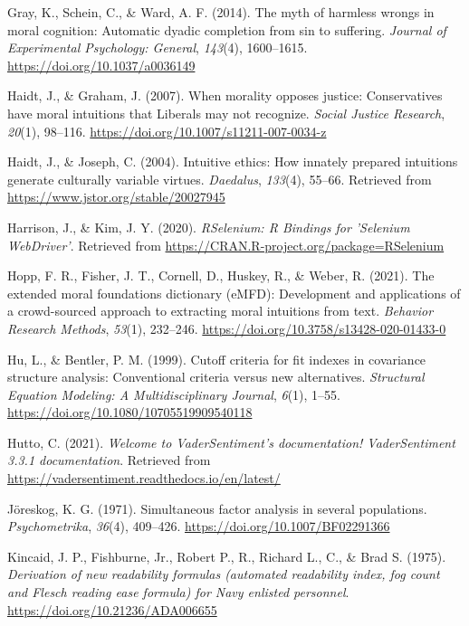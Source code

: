 \documentclass[
  man,floatsintext]{apa6}
\newlength{\cslhangindent}
\newenvironment{CSLReferences}[2] %
 {\begin{list}{}{%
  \setlength{\itemindent}{0pt}
  \setlength{\leftmargin}{0pt}
  \setlength{\parsep}{0pt}
  \ifodd #1
   \setlength{\leftmargin}{\cslhangindent}
   \setlength{\itemindent}{-1\cslhangindent}
  \fi
  \setlength{\itemsep}{#2\baselineskip}}}
 {\end{list}}
\begin{document}
\begin{CSLReferences}{1}{0}
Gray, K., Schein, C., \& Ward, A. F. (2014). The myth of harmless wrongs in moral cognition: Automatic dyadic completion from sin to suffering. \emph{Journal of Experimental Psychology: General}, \emph{143}(4), 1600--1615. \url{https://doi.org/10.1037/a0036149}

Haidt, J., \& Graham, J. (2007). {When morality opposes justice: Conservatives have moral intuitions that Liberals may not recognize}. \emph{Social Justice Research}, \emph{20}(1), 98--116. \url{https://doi.org/10.1007/s11211-007-0034-z}

Haidt, J., \& Joseph, C. (2004). Intuitive ethics: How innately prepared intuitions generate culturally variable virtues. \emph{Daedalus}, \emph{133}(4), 55--66. Retrieved from \url{https://www.jstor.org/stable/20027945}

Harrison, J., \& Kim, J. Y. (2020). \emph{{RSelenium}: {R} {Bindings} for '{Selenium} {WebDriver}'}. Retrieved from \url{https://CRAN.R-project.org/package=RSelenium}

Hopp, F. R., Fisher, J. T., Cornell, D., Huskey, R., \& Weber, R. (2021). The extended moral foundations dictionary (eMFD): Development and applications of a crowd-sourced approach to extracting moral intuitions from text. \emph{Behavior Research Methods}, \emph{53}(1), 232--246. \url{https://doi.org/10.3758/s13428-020-01433-0}

Hu, L., \& Bentler, P. M. (1999). Cutoff criteria for fit indexes in covariance structure analysis: Conventional criteria versus new alternatives. \emph{Structural Equation Modeling: A Multidisciplinary Journal}, \emph{6}(1), 1--55. \url{https://doi.org/10.1080/10705519909540118}

Hutto, C. (2021). \emph{Welcome to VaderSentiment{'}s documentation! {\textemdash} VaderSentiment 3.3.1 documentation}. Retrieved from \url{https://vadersentiment.readthedocs.io/en/latest/}

Jöreskog, K. G. (1971). Simultaneous factor analysis in several populations. \emph{Psychometrika}, \emph{36}(4), 409--426. \url{https://doi.org/10.1007/BF02291366}

Kincaid, J. P., Fishburne, Jr., Robert P., R., Richard L., C., \& Brad S. (1975). \emph{Derivation of new readability formulas (automated readability index, fog count and {F}lesch reading ease formula) for {N}avy enlisted personnel}. \url{https://doi.org/10.21236/ADA006655}


\end{CSLReferences}
\end{document}
